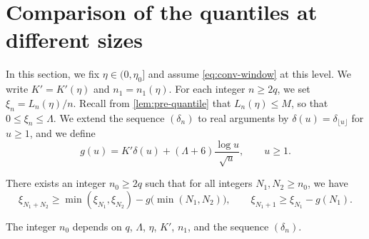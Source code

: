 \section{Comparison of the quantiles at different sizes}\label{sec:conv-superadd}

In this section, we fix $\eta \in (0, \eta_0]$ and assume \eqref{eq:conv-window} at this level. We write $K' = K'(\eta)$ and $n_1 = n_1(\eta)$. For each integer $n \ge 2q$, we set $\xi_n = L_n(\eta)/n$. Recall from \cref{lem:pre-quantile} that $L_n(\eta) \le M$, so that $0 \le \xi_n \le \Lambda$. We extend the sequence $(\delta_n)$ to real arguments by $\delta(u) = \delta_{\lfloor u \rfloor}$ for $u \ge 1$, and we define
\begin{equation}\label{eq:conv-g}
g(u) = K' \delta(u) + (\Lambda + 6) \frac{\log u}{\sqrt u}, \qquad u \ge 1.
\end{equation}

\begin{lemma}\label{lem:conv-superadd}
There exists an integer $n_0 \ge 2q$ such that for all integers $N_1, N_2 \ge n_0$, we have
\begin{equation}\label{eq:conv-superadd}
\xi_{N_1 + N_2} \ge \min(\xi_{N_1}, \xi_{N_2}) - g\big(\min(N_1, N_2)\big), \qquad \xi_{N_1 + 1} \ge \xi_{N_1} - g(N_1).
\end{equation}
\end{lemma}

The integer $n_0$ depends on $q$, $\Lambda$, $\eta$, $K'$, $n_1$, and the sequence $(\delta_n)$.

